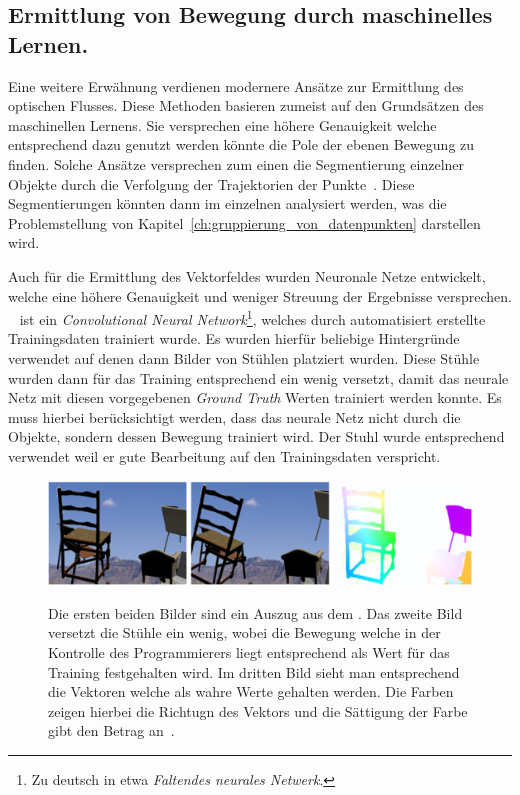 \subsection{Ermittlung von Bewegung durch maschinelles Lernen.}

Eine weitere Erwähnung verdienen modernere Ansätze zur Ermittlung des optischen Flusses.
Diese Methoden basieren zumeist auf den Grundsätzen des maschinellen Lernens.
Sie versprechen eine höhere Genauigkeit welche entsprechend dazu genutzt werden könnte die Pole der ebenen Bewegung zu finden.
Solche Ansätze versprechen zum einen die Segmentierung einzelner Objekte durch die Verfolgung der Trajektorien der Punkte~\cite{Ochs2014, Keuper2015}.
Diese Segmentierungen könnten dann im einzelnen analysiert werden, was die Problemstellung von Kapitel~\ref{ch:gruppierung_von_datenpunkten} darstellen wird.

Auch für die Ermittlung des Vektorfeldes wurden Neuronale Netze entwickelt, welche eine höhere Genauigkeit und weniger Streuung der Ergebnisse versprechen.
~\cite{Fischer2015} ist ein \textit{Convolutional Neural Network}\footnote{Zu deutsch in etwa \textit{Faltendes neurales Netwerk}.}, welches durch automatisiert erstellte Trainingsdaten trainiert wurde.
Es wurden hierfür beliebige Hintergründe verwendet auf denen dann Bilder von Stühlen platziert wurden.
Diese Stühle wurden dann für das Training entsprechend ein wenig versetzt, damit das neurale Netz mit diesen vorgegebenen \textit{Ground Truth} Werten trainiert werden konnte.
Es muss hierbei berücksichtigt werden, dass das neurale Netz nicht durch die Objekte, sondern dessen Bewegung trainiert wird.
Der Stuhl wurde entsprechend verwendet weil er gute Bearbeitung auf den Trainingsdaten verspricht.

\begin{figure}
    \centering
    \includegraphics[width=\textwidth]{gfx/flownet_flying_chairs.png}
    \label{fig:flownet_flying_chairs}
    \caption[Beispiele aus dem ]{Die ersten beiden Bilder sind ein Auszug aus dem . Das zweite Bild versetzt die Stühle ein wenig, wobei die Bewegung welche in der Kontrolle des Programmierers liegt entsprechend als Wert für das Training festgehalten wird. Im dritten Bild sieht man entsprechend die Vektoren welche als wahre Werte gehalten werden. Die Farben zeigen hierbei die Richtugn des Vektors und die Sättigung der Farbe gibt den Betrag an~\cite{Fischer2015}.}
\end{figure}

